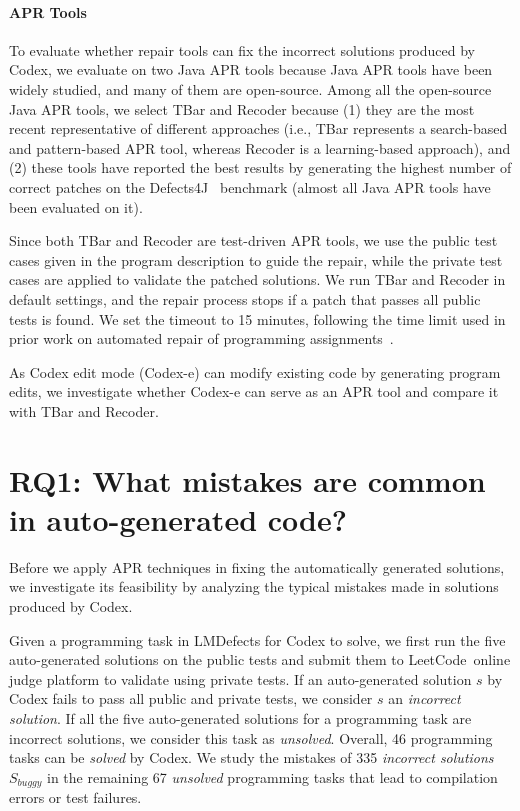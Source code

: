 \paragraph{\textbf{APR Tools}}

To evaluate whether repair tools can fix the incorrect solutions produced by Codex, we evaluate on two Java APR tools because Java APR tools have been widely studied, and many of them are open-source. Among all the open-source Java APR tools, we select TBar and Recoder because (1) they are the most recent representative of different approaches (i.e., TBar represents a search-based and pattern-based APR tool, whereas Recoder is a learning-based approach), and (2) these tools have reported the best results by generating the highest number of correct patches on the Defects4J~\cite{defects4j} benchmark (almost all Java APR tools have been evaluated on it). 

Since both TBar and Recoder are test-driven APR tools, we use the public test cases given in the program description to guide the repair, while the private test cases are applied to validate the patched solutions. We run TBar and Recoder in default settings, and the repair process stops if a patch that passes all public tests is found. We set the timeout to 15 minutes, following the time limit used in prior work on automated repair of programming assignments~\cite{yi2017feasibility}.

As Codex edit mode (Codex-e) can modify existing code by generating program edits, we investigate whether Codex-e can serve as an APR tool and compare it  with TBar and Recoder. 

\section{RQ1: What mistakes are common in auto-generated code?}
\label{sec:rq1}

Before we apply APR techniques in fixing the automatically generated solutions, we investigate its feasibility by analyzing the typical mistakes made in solutions produced by Codex.

Given a programming task in LMDefects for Codex to solve, we first run the five auto-generated solutions on the public tests and submit them to LeetCode~online judge platform to validate using private tests. If an auto-generated solution $s$ by Codex fails to pass all public and private tests, we consider $s$ an \emph{incorrect solution}. If all the five auto-generated solutions for a programming task are incorrect solutions, we consider this task as \emph{unsolved}. 
Overall, 46 programming tasks can be \emph{solved} by Codex. We study the mistakes of 335 \emph{incorrect solutions} $S_{buggy}$ in the remaining 67 \emph{unsolved} programming tasks that lead to compilation errors or test failures. 

